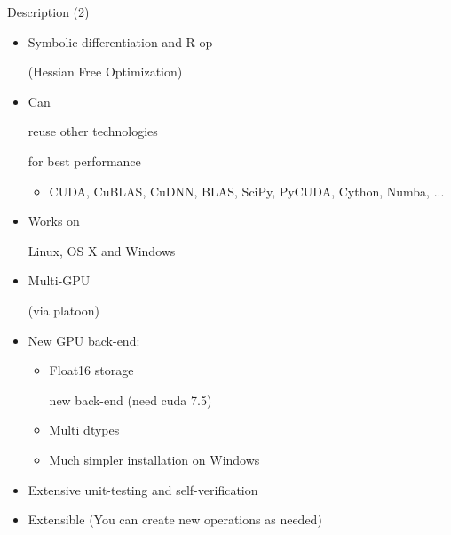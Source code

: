 \documentclass[utf8x,xcolor=pdftex,dvipsnames,table]{beamer}
\begin{document}
\begin{frame}{Description (2)}

  \begin{itemize}
    \item \begin{bf}Symbolic differentiation and R op\end{bf} (Hessian Free Optimization)
    \item Can \begin{bf}reuse other technologies\end{bf} for best performance
    \begin{itemize}
      \item CUDA, CuBLAS, CuDNN, BLAS, SciPy, PyCUDA, Cython, Numba, ...
    \end{itemize}
    \item Works on \begin{bf}Linux, OS X and Windows\end{bf}
    \item \begin{bf}Multi-GPU\end{bf} (via platoon)
    \item New GPU back-end:
      \begin{itemize}
      \item \begin{bf}Float16 storage\end{bf} new back-end (need cuda 7.5)
      \item \begin{bf}Multi dtypes\end{bf}
      \item \begin{bf}Much simpler installation on Windows\end{bf}
      \end{itemize}
    \item Extensive unit-testing and self-verification
    \item Extensible (You can create new operations as needed)
  \end{itemize}
\end{frame}



\end{document}
